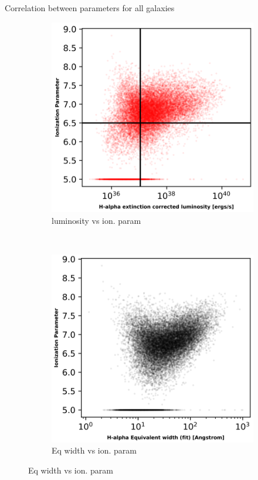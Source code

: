 \documentclass{beamer}
\begin{document}
\begin{frame}{Correlation between parameters for all galaxies}
    \begin{figure}
        \centering
        \begin{subfigure}{0.45\textwidth}
            \includegraphics[scale = 0.15]{image37.png}
            \caption{luminosity vs ion. param}
        \end{subfigure}
        ~
        \begin{subfigure}{0.45\textwidth}
                \includegraphics[scale = 0.15]{image38.png}
                \caption{Eq width vs ion. param}
                \label{fig:image6}
        \end{subfigure}
    \end{figure}


\end{frame}
\end{document}
